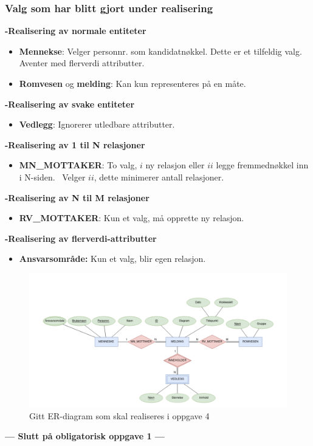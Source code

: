 \documentclass{article}
\begin{document}
\subsubsection*{Valg som har blitt gjort under realisering}
\textbf{-Realisering av normale entiteter}

\begin{itemize}
    \item \textbf{Mennekse}: Velger personnr. som kandidatnøkkel. Dette er et tilfeldig valg. Aventer med flerverdi attributter.
    \item \textbf{Romvesen} og \textbf{melding}: Kan kun representeres på en måte. 
\end{itemize}

\textbf{-Realisering av svake entiteter}
\begin{itemize}
    \item \textbf{Vedlegg}: Ignorerer utledbare attributter.
\end{itemize}
\newpage
\textbf{-Realisering av 1 til N relasjoner}
\begin{itemize}
    \item \textbf{MN\_MOTTAKER}: To valg, \(i\) ny relasjon eller \(ii\) legge fremmednøkkel inn i N-siden. \
    Velger \(ii\), dette minimerer antall relasjoner. 
\end{itemize}

\textbf{-Realisering av N til M relasjoner}
\begin{itemize}
    \item \textbf{RV\_MOTTAKER}: Kun et valg, må opprette ny relasjon.
\end{itemize}

\textbf{-Realisering av flerverdi-attributter}
\begin{itemize}
    \item \textbf{Ansvarsområde:} Kun et valg, blir egen relasjon.  
\end{itemize}

\begin{figure}[h!]
    \centering
    \includegraphics[width=1\textwidth]{oppgave4.png} %
    \caption{Gitt ER-diagram som skal realiseres i oppgave 4} %
    \label{fig:oppgave4} %
\end{figure}
\hfill
\begin{center}
\textbf{--- Slutt på obligatorisk oppgave 1 ---}
\end{center}
\end{document}
